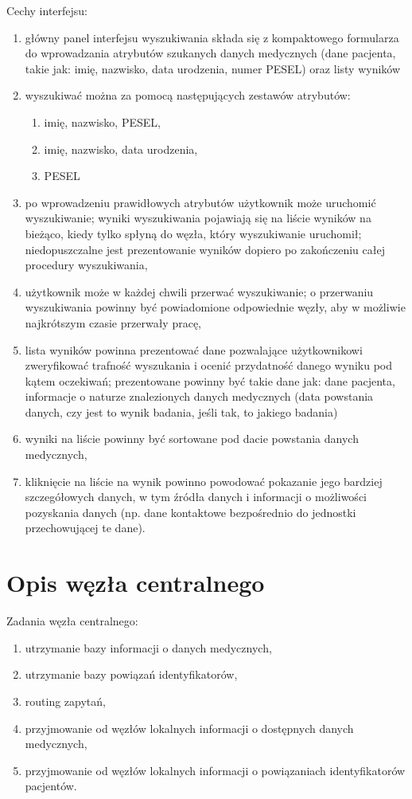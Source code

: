 \documentclass[a4paper]{report}
\begin{document}
Cechy interfejsu:
\begin{enumerate}
  \item główny panel interfejsu wyszukiwania składa się z kompaktowego formularza do wprowadzania atrybutów szukanych danych medycznych (dane pacjenta, takie jak: imię, nazwisko, data urodzenia, numer PESEL) oraz listy wyników
  \item wyszukiwać można za pomocą następujących zestawów atrybutów:
  \begin{enumerate}
    \item imię, nazwisko, PESEL,
    \item imię, nazwisko, data urodzenia,
    \item PESEL
  \end{enumerate}
  \item po wprowadzeniu prawidłowych atrybutów użytkownik może uruchomić wyszukiwanie; wyniki wyszukiwania pojawiają się na liście wyników na bieżąco, kiedy tylko spłyną do węzła, który wyszukiwanie uruchomił; niedopuszczalne jest prezentowanie wyników dopiero po zakończeniu całej procedury wyszukiwania,
  \item użytkownik może w każdej chwili przerwać wyszukiwanie; o przerwaniu wyszukiwania powinny być powiadomione odpowiednie węzły, aby w możliwie najkrótszym czasie przerwały pracę,
  \item lista wyników powinna prezentować dane pozwalające użytkownikowi zweryfikować trafność wyszukania i ocenić przydatność danego wyniku pod kątem oczekiwań; prezentowane powinny być takie dane jak: dane pacjenta, informacje o naturze znalezionych danych medycznych (data powstania danych, czy jest to wynik badania, jeśli tak, to jakiego badania)
  \item wyniki na liście powinny być sortowane pod dacie powstania danych medycznych,
  \item kliknięcie na liście na wynik powinno powodować pokazanie jego bardziej szczegółowych danych, w tym źródła danych i informacji o możliwości pozyskania danych (np. dane kontaktowe bezpośrednio do jednostki przechowującej te dane).
\end{enumerate}

\section{Opis węzła centralnego}

Zadania węzła centralnego:
  \begin{enumerate}
    \item utrzymanie bazy informacji o danych medycznych,
    \item utrzymanie bazy powiązań identyfikatorów,
    \item routing zapytań,
    \item przyjmowanie od węzłów lokalnych informacji o dostępnych danych medycznych,
    \item przyjmowanie od węzłów lokalnych informacji o powiązaniach identyfikatorów pacjentów.
  \end{enumerate}
\end{document}
